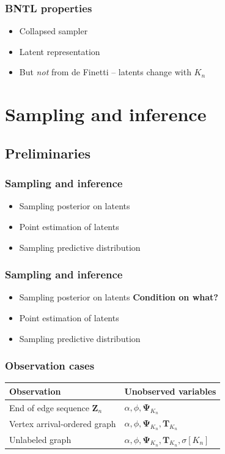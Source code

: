 \documentclass[final,hyperref={pdfpagelabels=false},noamsthm]{beamer}
\newcommand{\ee}{Z} %
\newcommand{\bfee}{\mathbf{\ee}}
\newcommand{\bfT}{\mathbf{T}}
\newcommand{\bfPsi}{\boldsymbol{\Psi}}
\begin{document}
\begin{frame}
	\frametitle{BNTL properties}
	\begin{itemize}
		\item Collapsed sampler
		\item Latent representation
		\item But \textit{not} from de Finetti -- latents change with $K_n$
	\end{itemize}
\end{frame}


\section{Sampling and inference}
\subsection{Preliminaries}
\begin{frame}
	\frametitle{Sampling and inference}
	\begin{itemize}
		\item Sampling posterior on latents
		\item Point estimation of latents
		\item Sampling predictive distribution
	\end{itemize}
\end{frame}

\begin{frame}
	\frametitle{Sampling and inference}
	\begin{itemize}
		\item Sampling posterior on latents \textbf{Condition on what?}
		\item Point estimation of latents 
		\item Sampling predictive distribution
	\end{itemize}
\end{frame}

\begin{frame}
	\frametitle{Observation cases}
	\begin{center}
		\begin{tabular}{ll}
			\textbf{Observation} & \textbf{Unobserved variables} \\
			\hline
			End of edge sequence $\bfee_n$ & $\alpha,\phi,\bfPsi_{K_n}$ \\
			Vertex arrival-ordered graph & $\alpha,\phi,\bfPsi_{K_n}, \bfT_{K_n}$ \\
			Unlabeled graph & $\alpha,\phi,\bfPsi_{K_n},\bfT_{K_n},\sigma [K_n]$
		\end{tabular}
	\end{center}
\end{frame}
\end{document}
